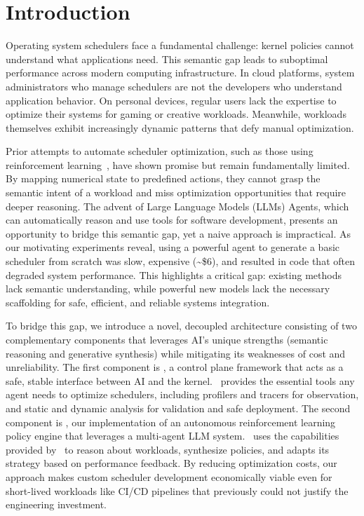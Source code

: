 \section{Introduction}
\label{sec:intro}

Operating system schedulers face a fundamental challenge: kernel policies cannot understand what applications need. This semantic gap leads to suboptimal performance across modern computing infrastructure. In cloud platforms, system administrators who manage schedulers are not the developers who understand application behavior. On personal devices, regular users lack the expertise to optimize their systems for gaming or creative workloads. Meanwhile, workloads themselves exhibit increasingly dynamic patterns that defy manual optimization.

Prior attempts to automate scheduler optimization, such as those using reinforcement learning~\cite{mao2019decima, qiu2020firm}, have shown promise but remain fundamentally limited. By mapping numerical state to predefined actions, they cannot grasp the semantic intent of a workload and miss optimization opportunities that require deeper reasoning. The advent of Large Language Models (LLMs) Agents, which can automatically reason and use tools for software development, presents an opportunity to bridge this semantic gap, yet a naive approach is impractical. As our motivating experiments reveal, using a powerful agent to generate a basic scheduler from scratch was slow, expensive (\textasciitilde\$6), and resulted in code that often degraded system performance. This highlights a critical gap: existing methods lack semantic understanding, while powerful new models lack the necessary scaffolding for safe, efficient, and reliable systems integration.

To bridge this gap, we introduce a novel, decoupled architecture consisting of two complementary components that leverages AI's unique strengths (semantic reasoning and generative synthesis) while mitigating its weaknesses of cost and unreliability. The first component is \sys, a control plane framework that acts as a safe, stable interface between AI and the kernel. \sys\ provides the essential tools any agent needs to optimize schedulers, including profilers and tracers for observation, and static and dynamic analysis for validation and safe deployment. The second component is \agent, our implementation of an autonomous reinforcement learning policy engine that leverages a multi-agent LLM system. \agent\ uses the capabilities provided by \sys\ to reason about workloads, synthesize policies, and adapts its strategy based on performance feedback. By reducing optimization costs, our approach makes custom scheduler development economically viable even for short-lived workloads like CI/CD pipelines that previously could not justify the engineering investment.

